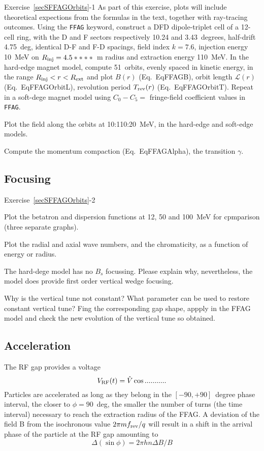\smallskip
\noindent {\small $\bullet$} Exercise~\ref{secSFFAGOrbits}-1 
As part of  this exercise, plots will include theoretical expections from the formulas in the text, 
together with ray-tracing outcomes.
Using the \texttt{FFAG} keyword, 
construct a DFD dipole-triplet cell of a 12-cell ring, with the D and F sectors respectively 10.24 and 3.43~degrees, 
half-drift 4.75~deg, identical D-F and F-D spacings, field index $k=7.6$, 
 injection energy 10~MeV on $R_{\rm inj}=4.5****$~m radius and extraction energy 110~MeV.
In the hard-edge magnet model, 
compute 51~orbits, evenly spaced in kinetic energy, in the  range $R_{\rm inj} <r< R_{\rm ext}$ and
plot $B(r)$ (Eq.~{EqFFAGB}), orbit length $\mathcal{L}(r)$ (Eq.~{EqFFAGOrbitL}), revolution period $T_{\rm rev}(r)$ 
(Eq.~{EqFFAGOrbitT}).
Repeat in a soft-dege magnet model using $C_0-C_5 = $ fringe-field coefficient values in \texttt{FFAG}.

Plot the field along the orbits at 10:110:20~MeV, in the hard-edge and soft-edge models.

Compute the momentum compaction (Eq.~{EqFFAGAlpha}), the transition $\gamma$.


\subsection{Focusing \label{secSFFAGFocus}}

\noindent {\small $\bullet$} Exercise~\ref{secSFFAGOrbits}-2 

Plot the betatron and dispersion functions  at 12, 50 and 100~MeV for cpmparison 
(three separate graphs). 

Plot the radial and axial wave numbers, and the chromaticity, as a function of energy or radius. 

The hard-dege model has no $B_s$ focussing. Please explain why, nevertheless, the model 
does provide first order vertical wedge focusing. 

Why is the vertical tune not constant? What parameter can be used to restore constant vertical tune? 
Fing the corresponding gap shape, appply in the FFAG model and check the new evolution of the vertical 
tune so obtained. 


\subsection{Acceleration}\label{secSFFAGAccel}


The RF gap provides a voltage  
\begin{equation}
\label{EqRCyclo}
V_{\rm RF}(t) =\hat V \cos ........... 
\end{equation}
Particles are accelerated as long as they belong in the $[-90,+90]$~degree phase interval, 
the closer to $\phi=90$~deg, the smaller the number of turns 
(the time interval) necessary to reach the extraction radius of the FFAG.
A deviation of the field B from the isochronous value $2\pi m f_{\rm rev}/q$
will result in a  shift in the arrival phase of the particle at the RF gap amounting to 
\begin{equation}
\label{EqPFPhaseCyclo}
\Delta (\sin \phi) = 2\pi h n \Delta B/B
\end{equation}

